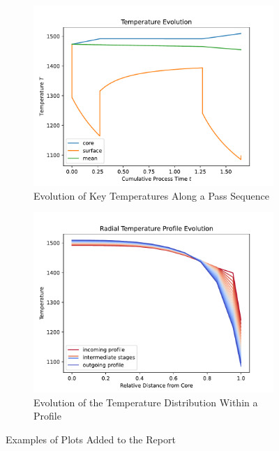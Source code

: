 \documentclass{PyRollDocs}
\begin{document}
    \begin{figure}
        \centering
        \begin{subfigure}[t]{0.48\linewidth}
            \centering
            \includegraphics[width=\linewidth]{img/temperature_evolution_plot}
            \caption{Evolution of Key Temperatures Along a Pass Sequence}
            \label{fig:temperature_evolution_plot}
        \end{subfigure}
        \hfill
        \begin{subfigure}[t]{0.48\linewidth}
            \centering
            \includegraphics[width=\linewidth]{img/temperature_profile_plot}
            \caption{Evolution of the Temperature Distribution Within a Profile}
            \label{fig:temperature_profile_plot}
        \end{subfigure}
        \caption{Examples of Plots Added to the Report}
        \label{fig:report_plots}
    \end{figure}
\end{document}
